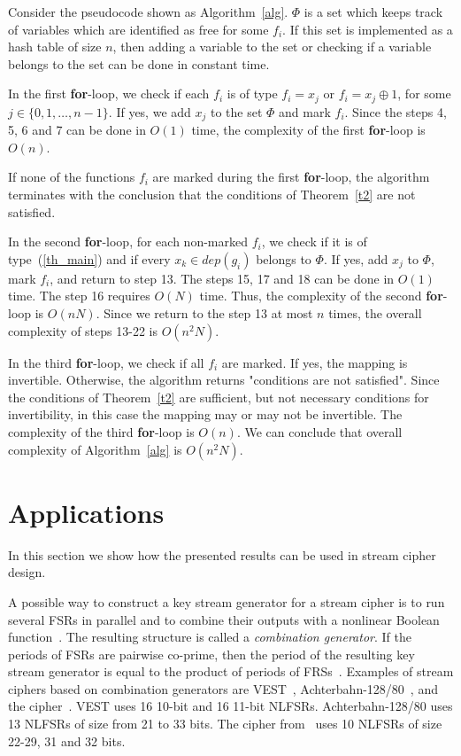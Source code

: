 \documentclass[9pt,conference]{IEEEtran} \usepackage{times}
\begin{document}
Consider the pseudocode shown as Algorithm~\ref{alg}.
$\Phi$ is a set which keeps track of variables which are identified as free for some $f_i$. If this set is implemented as a hash table of size $n$, then adding a variable to the set or checking if a variable belongs to the set can be done in constant time.

In the first {\bf for}-loop, we check if each $f_i$ is of type $f_i = x_j$
or $f_i = x_j \oplus 1$, for some $j \in \{0,1,\ldots,n-1\}$. If yes, we 
add $x_j$ to the set $\Phi$ and mark $f_i$. Since the steps 4, 5, 6 and 7 can be done 
in $O(1)$ time, the complexity of the first {\bf for}-loop is $O(n)$.

If none of the functions $f_i$ are marked during the first {\bf for}-loop, the algorithm terminates with the conclusion that the conditions of Theorem~\ref{t2} are not satisfied.

In the second {\bf for}-loop, for each non-marked $f_i$, we check if it is of type~(\ref{th_main}) 
and if every $x_k \in dep(g_i)$ belongs to $\Phi$.
If yes, add $x_j$ to $\Phi$, mark $f_i$, and return to step 13.
The steps 15, 17 and 18 can be done in $O(1)$ time.
The step 16 requires $O(N)$ time.
Thus, the complexity of the second {\bf for}-loop is $O(n N)$.
Since we return to the step 13 at most $n$ times, 
the overall complexity of steps 13-22 is $O(n^2 N)$.

In the third {\bf for}-loop, we check if all $f_i$ are marked.
If yes, the mapping is invertible. Otherwise, the algorithm
returns "conditions are not satisfied". Since the
conditions of Theorem~\ref{t2} are sufficient, but not necessary conditions for invertibility, in this case the mapping may or may not be invertible. The complexity of the third {\bf for}-loop is $O(n)$.
We can conclude that overall complexity of Algorithm~\ref{alg} is $O(n^2 N)$.

\section{Applications} \label{appl}

In this section we show how the presented results can be used in stream cipher design.

A possible way to construct a key stream generator for a stream cipher is  
to run several FSRs in parallel and to combine their outputs with a nonlinear Boolean function~\cite{CuS09}. 
The resulting structure is called a {\em combination generator}.
If the periods of FSRs are pairwise co-prime, then the period of the resulting key stream generator
is equal to the product of periods of FRSs~\cite{DuT05}. Examples of stream ciphers based on combination generators are VEST~\cite{cryptoeprint:2005:415}, Achterbahn-128/80~\cite{GaGK07}, and the cipher~\cite{GaGK06}. VEST uses 16 10-bit and 16 11-bit NLFSRs. Achterbahn-128/80 uses 13 NLFSRs of size from 21 to 33 bits. The cipher from~\cite{GaGK06} uses 10 NLFSRs of size 22-29, 31 and 32 bits.
\end{document}
